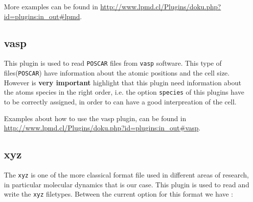 More examples can be found in
\url{http://www.lpmd.cl/Plugins/doku.php?id=plugins:in_out#lpmd}.

\subsection{vasp}

This plugin is used to read \verb|POSCAR| files from \verb|vasp| software. This
type of files(\verb|POSCAR|) have information about the atomic positions and
the cell size. However is \textbf{very important} highlight that this plugin
need information about the atoms species in the right order, i.e. the option
\verb|species| of this plugins have to be correctly assigned, in order to can
have a good interpreation of the cell.


Examples about how to use the vasp plugin, can be found in
\url{http://www.lpmd.cl/Plugins/doku.php?id=plugins:in_out#vasp}.

\subsection{xyz}

The \verb|xyz| is one of the more classical format file used in different areas
of research, in particular molecular dynamics that is our case. This plugin is
used to read and write the \verb|xyz| filetypes. Between the current option for
this format we have :


